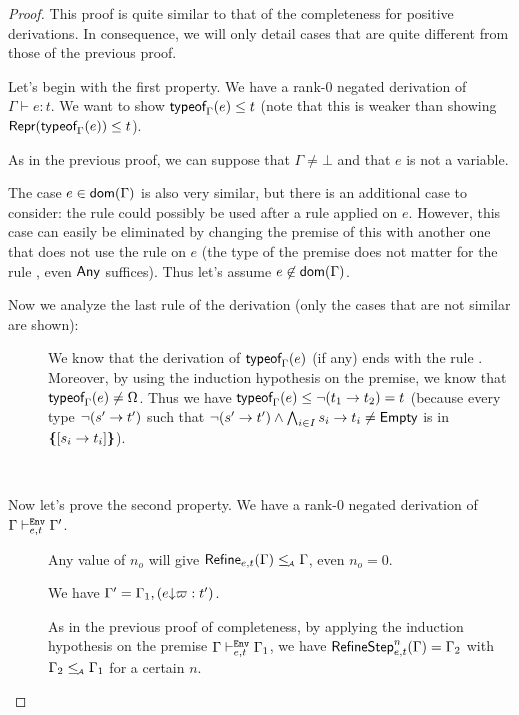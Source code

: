\documentclass[a4paper]{article}
\theoremstyle{definition}
\begin{document}
  \begin{proof}
    This proof is quite similar to that of the completeness for positive derivations.
    In consequence, we will only detail cases that are quite different from those of the previous proof.

    Let's begin with the first property. We have a rank-0 negated derivation of $\Gamma \vdash e:t$.
    We want to show $\textsf{typeof}_{\Gamma}(e) \leq t$ (note that this is weaker than showing $\textsf{Repr}(\textsf{typeof}_{\Gamma}(e)) \leq t$).

    As in the previous proof, we can suppose that $\Gamma \neq \bot$ and that $e$ is not a variable.

    The case $e\in\textsf{dom}(\Gamma)$ is also very similar, but there is an additional case to consider:
    the rule  could possibly be used after a rule  applied on $e$.
    However, this case can easily be eliminated by changing the premise of this  with another one
    that does not use the rule  on $e$ (the type of the premise does not matter for the rule ,
    even $\textsf{Any}$ suffices). Thus let's assume $e\not\in\textsf{dom}(\Gamma)$.

    Now we analyze the last rule of the derivation (only the cases that are not similar are shown):
    \begin{description}
      \item[] We know that the derivation of $\textsf{typeof}_{\Gamma}(e)$ (if any) ends with the rule .
      Moreover, by using the induction hypothesis on the premise, we know that $\textsf{typeof}_{\Gamma}(e) \neq \Omega$.
      Thus we have $\textsf{typeof}_{\Gamma}(e) \leq \neg (t_1\to t_2) = t$ (because every type $\neg (s'\to t')$
      such that $\neg (s'\to t') \land \bigwedge_{i\in I} s_i\to t_i \neq \textsf{Empty}$ is in $\textbf{\textup{\{}}{[}s_i\to t_i]\textbf{\textup{\}}}$).
    \end{description}

    \ 

    Now let's prove the second property. We have a rank-0 negated derivation of $\Gamma \vdash^{\texttt{Env}}_{e,t} \Gamma'$.

    \begin{description}
      \item[] Any value of $n_o$ will give $\textsf{Refine}_{e,t}(\Gamma) \leq_{\!\scriptscriptstyle\mathcal{A}} \Gamma$, even $n_o = 0$.
      \item[] We have $\Gamma' = \Gamma_1,(e{\downarrow}\varpi:t')$.
       
      As in the previous proof of completeness,
      by applying the induction hypothesis on the premise $\Gamma \vdash^{\texttt{Env}}_{e,t} \Gamma_1$, we have
      $\textsf{RefineStep}_{e,t}^n (\Gamma) = \Gamma_2$ with $\Gamma_2 \leq_{\!\scriptscriptstyle\mathcal{A}} \Gamma_1$ for a certain $n$.


\end{description}
\end{proof}
\end{document}
